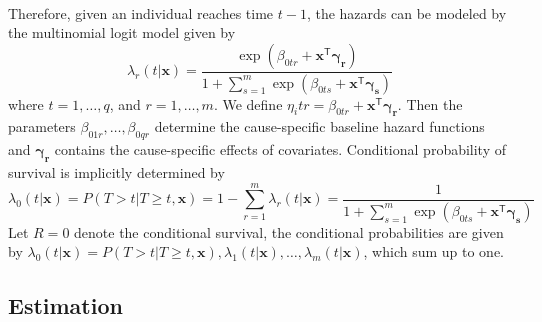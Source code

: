 \documentclass[]{article}
\begin{document}
    \paragraph{}Therefore, given an individual reaches time $t-1$, the hazards can be modeled by the multinomial logit model given by
    \begin{equation}\label{logit_model_r}
        \lambda_r(t|\mathbf{x}) = \frac{ \exp{ (\beta_{0tr}+\mathbf{x}^\mathsf{T} \mathbf{\gamma_r} ) } }{ 1+ \sum_{s=1}^{m} \exp{ (\beta_{0ts}+\mathbf{x}^\mathsf{T} \mathbf{\gamma_s}) }  }
    \end{equation}
    where $t = 1,\dots, q$, and $r = 1,\dots, m$. We define $\eta_itr = \beta_{0tr}+\mathbf{x}^\mathsf{T} \mathbf{\gamma_r}$. Then the parameters $\beta_{01r}, \dots, \beta_{0qr}$ determine the
    cause-specific baseline hazard functions and $\mathbf{\gamma_r}$ contains the cause-specific effects of
    covariates. Conditional probability of survival is implicitly determined by
    \begin{equation}\label{logit_model_0}
        \lambda_0(t|\mathbf{x})=P(T>t|T\geq t,\mathbf{x}) = 1 - \sum_{r=1}^{m} \lambda_r(t|\mathbf{x}) = \frac{ 1 }{ 1+ \sum_{s=1}^{m} \exp{ (\beta_{0ts}+\mathbf{x}^\mathsf{T} \mathbf{\gamma_s}) }  }
    \end{equation}
    Let $R = 0$ denote the conditional survival, the conditional
    probabilities are given by $\lambda_0(t|\mathbf{x}) = P(T > t|T \geq t, \mathbf{x}), \lambda_1(t|\mathbf{x}),\dots, \lambda_m(t|\mathbf{x})$, which sum
    up to one.
    
    \subsection{Estimation}
\end{document}
